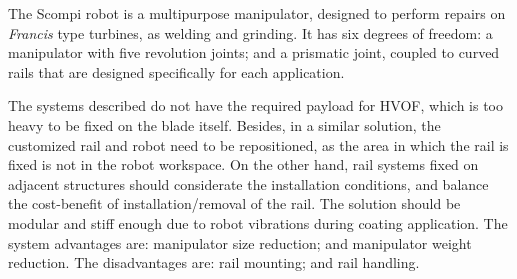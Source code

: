 The Scompi robot \citep{scompi} %
is a multipurpose manipulator, designed to perform repairs on \textit{Francis}
type turbines, as welding and grinding. It has six degrees of freedom: a
manipulator with five revolution joints; and a prismatic joint, coupled to
curved rails that are designed specifically for each application.



The systems described do not have the required payload for HVOF, which is too
heavy to be fixed on the blade itself. Besides, in a similar solution, the
customized rail and robot need to be repositioned, as the area in which the rail
is fixed is not in the robot workspace. On the other hand, rail systems fixed
on adjacent structures should considerate the installation conditions, and
balance the cost-benefit of installation/removal of the rail.
The solution should be modular and stiff enough due to robot vibrations during
coating application.
The system advantages are: manipulator size reduction; and manipulator
weight reduction. The disadvantages are: rail mounting; and rail
handling.